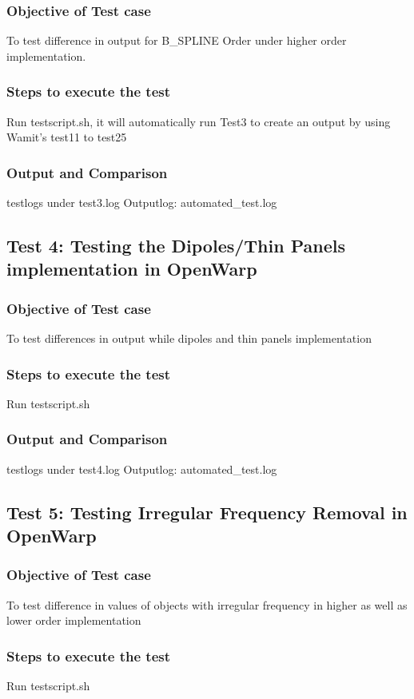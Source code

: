 \documentclass[12pt]{article}
\begin{document}
\subsubsection{Objective of Test case}
To test difference in output for B_SPLINE Order under higher order implementation.
\subsubsection{Steps to execute the test}
Run testscript.sh, it will automatically run Test3 to create an output by using Wamit's test11 to test25
\subsubsection{Output and Comparison}
testlogs under test3.log
Outputlog: automated_test.log

\subsection{Test 4: Testing the Dipoles/Thin Panels implementation in OpenWarp}
\subsubsection{Objective of Test case}
To test differences in output while dipoles and thin panels implementation
\subsubsection{Steps to execute the test}
Run testscript.sh
\subsubsection{Output and Comparison}
testlogs under test4.log
Outputlog: automated_test.log

\subsection{Test 5: Testing Irregular Frequency Removal in OpenWarp}
\subsubsection{Objective of Test case}
To test difference in values of objects with irregular frequency in higher as well as lower order implementation
\subsubsection{Steps to execute the test}
Run testscript.sh
\end{document}
